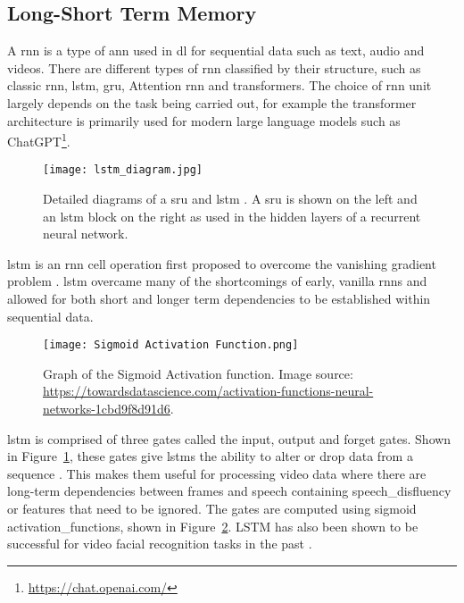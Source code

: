 \subsection{Long-Short Term Memory}
A \acrlong{rnn} is a type of \acrshort{ann} used in \acrfull{dl} for sequential data such as text, audio and videos. There are different types of \acrshort{rnn} classified by their structure, such as classic \acrshort{rnn}, \acrshort{lstm}, \acrshort{gru}, Attention \acrshort{rnn} and \gls{transformer}s. The choice of \acrshort{rnn} unit largely depends on the task being carried out, for example the \gls{transformer} architecture is primarily used for modern large language models such as  ChatGPT\footnote{\url{https://chat.openai.com/}}.\\
\begin{figure}
\centering
\texttt{[image: lstm\_diagram.jpg]}
\caption[Detailed diagrams of a \acrfull{sru} and \acrfull{lstm} Unit.]{Detailed diagrams of a \acrfull{sru} and \acrfull{lstm} \cite{lstm_diagram}. A \acrshort{sru} is shown on the left and an \acrshort{lstm} block on the right as used in the hidden layers of a recurrent neural network.}
\label{fig:lstm diagram}
\end{figure}
\acrfull{lstm} is an \acrshort{rnn} cell operation first proposed to overcome the vanishing gradient problem \cite{OG_LSTM}. \acrshort{lstm} overcame many of the shortcomings of early, vanilla \acrshort{rnn}s and allowed for both short and longer term dependencies to be established within sequential data.\\
\begin{figure}
\centering
\texttt{[image: Sigmoid Activation Function.png]}
\caption[Graph of the Sigmoid Activation function.]{Graph of the Sigmoid Activation function. Image source:\\ \url{https://towardsdatascience.com/activation-functions-neural-networks-1cbd9f8d91d6}.}
\label{fig:sigmoid diagram}
\end{figure}
\acrshort{lstm} is comprised of three gates called the input, output and forget gates. Shown in Figure~\ref{fig:lstm diagram}, these gates give \acrshort{lstm}s the ability to alter or drop data from a sequence \cite{Deep-learning:-RNNs-and-LSTM}. This makes them useful for processing video data where there are long-term dependencies between frames and speech containing \gls{speech_disfluency} or features that need to be ignored. The gates are computed using sigmoid \gls{activation_function}s, shown in Figure~\ref{fig:sigmoid diagram}. LSTM has also been shown to be successful for video facial recognition tasks in the past \cite{facial_expression_rec_lstm}.\\
